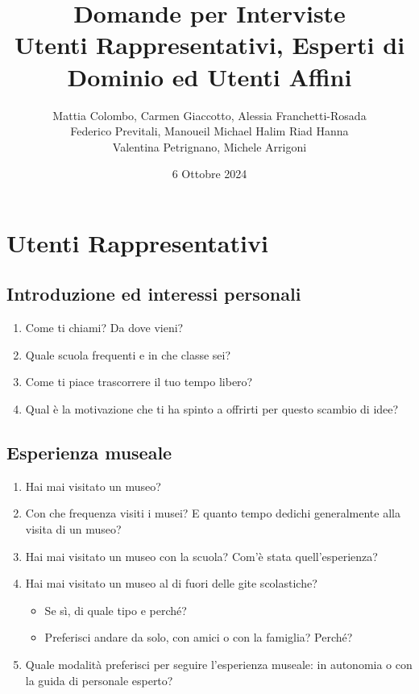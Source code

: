 \documentclass[a4paper, 12pt]{article}
\title{\textbf{Domande per Interviste} \\ Utenti Rappresentativi, Esperti di Dominio ed Utenti Affini}
\author{Mattia Colombo, Carmen Giaccotto, Alessia Franchetti-Rosada \\Federico Previtali, Manoueil Michael Halim Riad Hanna \\ Valentina Petrignano, Michele Arrigoni}
\date{6 Ottobre 2024}
\begin{document}
\maketitle

\section{\textcolor{sectioncolor}{Utenti Rappresentativi}}

\subsection{\textcolor{subsectioncolor}{Introduzione ed interessi personali}}
\begin{enumerate}[label=\textcolor{textcolor}{\arabic*.}]
    \item \textcolor{textcolor}{Come ti chiami? Da dove vieni?}
    \item \textcolor{textcolor}{Quale scuola frequenti e in che classe sei?}
    \item \textcolor{textcolor}{Come ti piace trascorrere il tuo tempo libero?}
    \item \textcolor{textcolor}{Qual è la motivazione che ti ha spinto a offrirti per questo scambio di idee?}
\end{enumerate}

\subsection{\textcolor{subsectioncolor}{Esperienza museale}}
\begin{enumerate}[label=\textcolor{textcolor}{\arabic*.}]
    \item \textcolor{textcolor}{Hai mai visitato un museo?}
    \item \textcolor{textcolor}{Con che frequenza visiti i musei? E quanto tempo dedichi generalmente alla visita di un museo?}
    \item \textcolor{textcolor}{Hai mai visitato un museo con la scuola? Com’è stata quell’esperienza?}
    \item \textcolor{textcolor}{Hai mai visitato un museo al di fuori delle gite scolastiche?}
    \begin{itemize}
        \item \textcolor{textcolor}{Se sì, di quale tipo e perché?}
        \item \textcolor{textcolor}{Preferisci andare da solo, con amici o con la famiglia? Perché?}
    \end{itemize}
    \item \textcolor{textcolor}{Quale modalità preferisci per seguire l'esperienza museale: in autonomia o con la guida di personale esperto?}
\end{enumerate}
\end{document}
